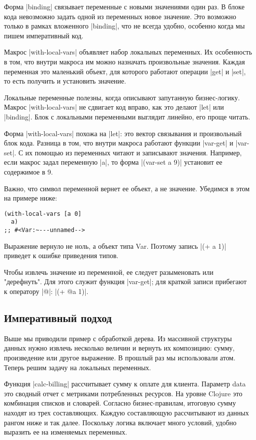 {{{{{{{{Форма \spverb|binding| связывает переменные с новыми значениями один раз. В блоке кода
невозможно задать одной из переменных новое значение. Это возможно только в
рамках вложенного \spverb|binding|, что не всегда удобно, особенно когда мы пишем
императивный код.

Макрос \spverb|with-local-vars| объявляет набор локальных переменных. Их особенность в
том, что внутри макроса им можно назначать произвольные значения. Каждая
переменная это маленький объект, для которого работают операции \spverb|get| и \spverb|set|,
то есть получить и установить значение.

Локальные переменные полезны, когда описывают запутанную бизнес-логику. Макрос
\spverb|with-local-vars| не сдвигает код вправо, как это делают \spverb|let| или
\spverb|binding|. Блок с локальными переменными выглядит линейно, его проще читать.

Форма \spverb|with-local-vars| похожа на \spverb|let|: это вектор связывания и произвольный
блок кода. Разница в том, что внутри макроса работают функции \spverb|var-get| и
\spverb|var-set|. С их помощью из переменных читают и записывают значения. Например,
если макрос задал переменную \spverb|a|, то форма \spverb|(var-set a 9)| установит ее
содержимое в 9.

Важно, что символ переменной вернет ее объект, а не значение. Убедимся в этом на
примере ниже:

\begin{verbatim}
(with-local-vars [a 0]
  a)
;; #<Var:~---unnamed-->
\end{verbatim}

Выражение вернуло не ноль, а объект типа Var. Поэтому запись \spverb|(+ a 1)| приведет
к ошибке приведения типов.

Чтобы извлечь значение из переменной, ее следует разыменовать или
"дерефнуть". Для этого служит функция \spverb|var-get|; для краткой записи прибегают к
оператору \spverb|@|: \spverb|(+ @a 1)|.

\subsection{Императивный подход}

Выше мы приводили пример с обработкой дерева. Из массивной структуры данных
нужно извлечь несколько величин и вернуть их композицию: сумму, произведение или
другое выражение. В прошлый раз мы использовали атом. Теперь решим задачу на
локальных переменных.

Функция \spverb|calc-billing| рассчитывает сумму к оплате для клиента. Параметр data
это сводный отчет с метриками потребленных ресурсов. На уровне Clojure это
комбинация списков и словарей. Согласно бизнес-правилам, итоговую сумму находят
из трех составляющих. Каждую составляющую рассчитывают из данных рангом ниже и
так далее. Поскольку логика включает много условий, удобно выразить ее на
изменяемых переменных.

}}}}}}}}
